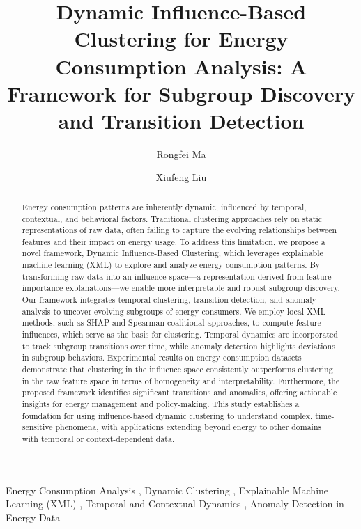 \documentclass[final,5p,times,twocolumn,numbers]{elsarticle}
\begin{document}
\begin{frontmatter}
\title{Dynamic Influence-Based Clustering for Energy Consumption Analysis: A Framework for Subgroup Discovery and Transition Detection}
\author[tzvcst]{Rongfei Ma}
\author[dtu]{Xiufeng Liu}

\address[tzvcst]{School of Information Engineering, Taizhou Vocational College of Science \& Technology, Taizhou 318020 Zhejiang, China}
\address[dtu]{Department of Technology, Management and Economics, Technical University of Denmark, 2800 Kgs. Lyngby, Denmark}

\begin{abstract}
Energy consumption patterns are inherently dynamic, influenced by temporal, contextual, and behavioral factors. Traditional clustering approaches rely on static representations of raw data, often failing to capture the evolving relationships between features and their impact on energy usage. To address this limitation, we propose a novel framework, Dynamic Influence-Based Clustering, which leverages explainable machine learning (XML) to explore and analyze energy consumption patterns. By transforming raw data into an influence space—a representation derived from feature importance explanations—we enable more interpretable and robust subgroup discovery.
Our framework integrates temporal clustering, transition detection, and anomaly analysis to uncover evolving subgroups of energy consumers. We employ local XML methods, such as SHAP and Spearman coalitional approaches, to compute feature influences, which serve as the basis for clustering. Temporal dynamics are incorporated to track subgroup transitions over time, while anomaly detection highlights deviations in subgroup behaviors. Experimental results on energy consumption datasets demonstrate that clustering in the influence space consistently outperforms clustering in the raw feature space in terms of homogeneity and interpretability. Furthermore, the proposed framework identifies significant transitions and anomalies, offering actionable insights for energy management and policy-making.
This study establishes a foundation for using influence-based dynamic clustering to understand complex, time-sensitive phenomena, with applications extending beyond energy to other domains with temporal or context-dependent data.
\end{abstract}

\begin{keyword}
Energy Consumption Analysis \sep
Dynamic Clustering \sep
Explainable Machine Learning (XML) \sep
Temporal and Contextual Dynamics \sep
Anomaly Detection in Energy Data
\end{keyword}

\end{frontmatter}
\end{document}
